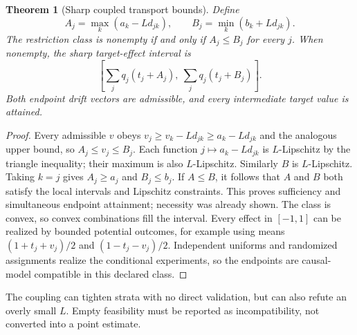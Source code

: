 \documentclass[11pt]{article}
\newtheorem{theorem}{Theorem}
\theoremstyle{remark}
\begin{document}
\begin{theorem}[Sharp coupled transport bounds]
Define
\[
 A_j=\max_k(a_k-Ld_{jk}),\qquad B_j=\min_k(b_k+Ld_{jk}).
\]
The restriction class is nonempty if and only if $A_j\le B_j$ for every $j$. When nonempty, the sharp target-effect interval is
\[
 \left[\sum_jq_j(t_j+A_j),\ \sum_jq_j(t_j+B_j)\right].
\]
Both endpoint drift vectors are admissible, and every intermediate target value is attained.
\end{theorem}
\begin{proof}
Every admissible $v$ obeys $v_j\ge v_k-Ld_{jk}\ge a_k-Ld_{jk}$ and the analogous upper bound, so $A_j\le v_j\le B_j$. Each function $j\mapsto a_k-Ld_{jk}$ is $L$-Lipschitz by the triangle inequality; their maximum is also $L$-Lipschitz. Similarly $B$ is $L$-Lipschitz. Taking $k=j$ gives $A_j\ge a_j$ and $B_j\le b_j$. If $A\le B$, it follows that $A$ and $B$ both satisfy the local intervals and Lipschitz constraints. This proves sufficiency and simultaneous endpoint attainment; necessity was already shown. The class is convex, so convex combinations fill the interval. Every effect in $[-1,1]$ can be realized by bounded potential outcomes, for example using means $(1+t_j+v_j)/2$ and $(1-t_j-v_j)/2$. Independent uniforms and randomized assignments realize the conditional experiments, so the endpoints are causal-model compatible in this declared class.
\end{proof}
The coupling can tighten strata with no direct validation, but can also refute an overly small $L$. Empty feasibility must be reported as incompatibility, not converted into a point estimate.
\end{document}
